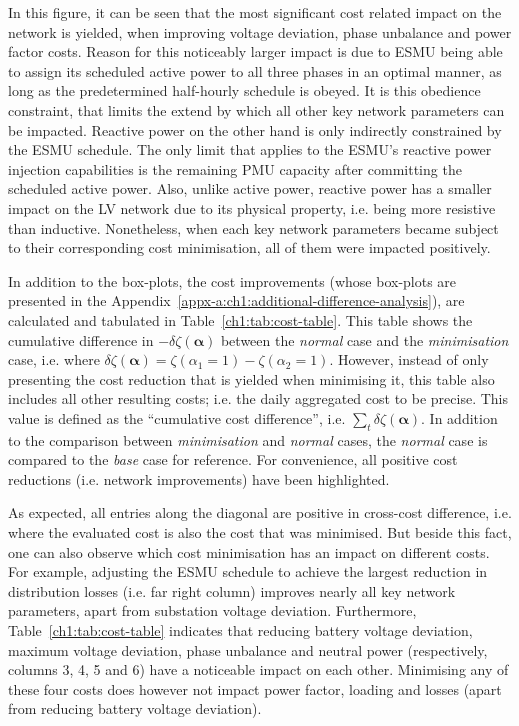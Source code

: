 In this figure, it can be seen that the most significant cost related impact on the network is yielded, when improving voltage deviation, phase unbalance and power factor costs.
Reason for this noticeably larger impact is due to ESMU being able to assign its scheduled active power to all three phases in an optimal manner, as long as the predetermined half-hourly schedule is obeyed.
It is this obedience constraint, that limits the extend by which all other key network parameters can be impacted.
Reactive power on the other hand is only indirectly constrained by the ESMU schedule.
The only limit that applies to the ESMU's reactive power injection capabilities is the remaining PMU capacity after committing the scheduled active power.
Also, unlike active power, reactive power has a smaller impact on the LV network due to its physical property, i.e. being more resistive than inductive.
Nonetheless, when each key network parameters became subject to their corresponding cost minimisation, all of them were impacted positively.

In addition to the box-plots, the cost improvements (whose box-plots are presented in the Appendix~\ref{appx-a:ch1:additional-difference-analysis}), are calculated and tabulated in Table~\ref{ch1:tab:cost-table}.
This table shows the cumulative difference in $-\delta\zeta(\boldsymbol{\alpha})$ between the \textit{normal} case and the \textit{minimisation} case, i.e. where $\delta\zeta(\boldsymbol{\alpha}) = \zeta(\alpha_1 = 1) - \zeta(\alpha_2 = 1)$.
However, instead of only presenting the cost reduction that is yielded when minimising it, this table also includes all other resulting costs; i.e. the daily aggregated cost to be precise.
This value is defined as the ``cumulative cost difference'', i.e. $\sum_t \delta\zeta(\boldsymbol{\alpha})$.
In addition to the comparison between \textit{minimisation} and \textit{normal} cases, the \textit{normal} case is compared to the \textit{base} case for reference.
For convenience, all positive cost reductions (i.e. network improvements) have been highlighted.



As expected, all entries along the diagonal are positive in cross-cost difference, i.e. where the evaluated cost is also the cost that was minimised.
But beside this fact, one can also observe which cost minimisation has an impact on different costs.
For example, adjusting the ESMU schedule to achieve the largest reduction in distribution losses (i.e. far right column) improves nearly all key network parameters, apart from substation voltage deviation.
Furthermore, Table~\ref{ch1:tab:cost-table} indicates that reducing battery voltage deviation, maximum voltage deviation, phase unbalance and neutral power (respectively, columns 3, 4, 5 and 6) have a noticeable impact on each other.
Minimising any of these four costs does however not impact power factor, loading and losses (apart from reducing battery voltage deviation).

